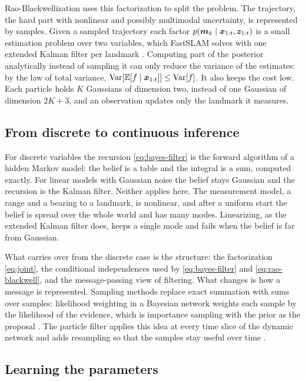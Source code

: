 Rao-Blackwellization \cite{doucet2000rao} uses this factorization to split the problem. The trajectory, the hard
part with nonlinear and possibly multimodal uncertainty, is represented by samples. Given a sampled trajectory each
factor $p(\bm{m}_k \mid \bm{x}_{1:t}, \bm{z}_{1:t})$ is a small estimation problem over two variables, which FastSLAM solves with
one extended Kalman filter per landmark \cite{montemerlo2002fastslam}. Computing part of the posterior analytically
instead of sampling it can only reduce the variance of the estimates: by the law of total variance,
$\operatorname{Var}[\mathbb{E}[f \mid \bm{x}_{1:t}]] \le \operatorname{Var}[f]$. It also keeps the cost low. Each
particle holds $K$ Gaussians of dimension two, instead of one Gaussian of dimension $2K + 3$, and an observation
updates only the landmark it measures.

\subsection{From discrete to continuous inference}

For discrete variables the recursion \eqref{eq:bayes-filter} is the forward algorithm of a hidden Markov model: the
belief is a table and the integral is a sum, computed exactly. For linear models with Gaussian noise the belief
stays Gaussian and the recursion is the Kalman filter. Neither applies here. The measurement model, a range and a
bearing to a landmark, is nonlinear, and after a uniform start the belief is spread over the whole world and has
many modes. Linearizing, as the extended Kalman filter does, keeps a single mode and fails when the belief is far
from Gaussian.

What carries over from the discrete case is the structure: the factorization \eqref{eq:joint}, the conditional
independences used by \eqref{eq:bayes-filter} and \eqref{eq:rao-blackwell}, and the message-passing view of
filtering. What changes is how a message is represented. Sampling methods replace exact summation with sums over
samples: likelihood weighting in a Bayesian network weights each sample by the likelihood of the evidence, which is
importance sampling with the prior as the proposal \cite[ch.~12]{koller2009probabilistic}. The particle filter
applies this idea at every time slice of the dynamic network and adds resampling so that the samples stay useful
over time \cite[ch.~15]{koller2009probabilistic}.

\subsection{Learning the parameters}\label{sec:learning}

